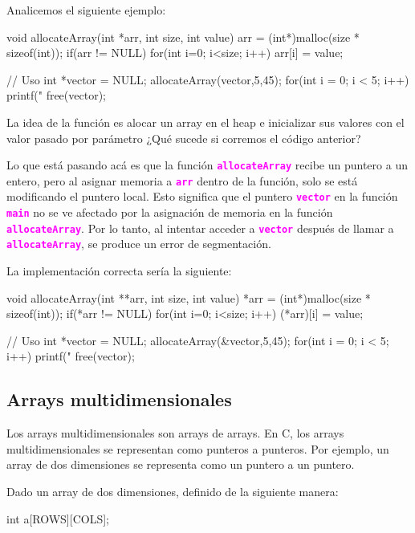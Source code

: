 \documentclass[]{scrartcl}
\newcommand{\hl}[1]{\textcolor{magenta}{\textbf{\texttt{#1}}}}
\begin{document}
Analicemos el siguiente ejemplo:

\begin{cbox}[]{}
  void allocateArray(int *arr, int size, int value) {
    arr = (int*)malloc(size * sizeof(int));
    if(arr != NULL) {
      for(int i=0; i<size; i++) {
        arr[i] = value;
      }
    }
  }
  
  // Uso
  int *vector = NULL;
  allocateArray(vector,5,45);
  for(int i = 0; i < 5; i++)
    printf("%
  free(vector);
\end{cbox}
\begin{exbox}
  La idea de la función es alocar un array en el heap e inicializar sus valores con el valor pasado por parámetro ¿Qué sucede si corremos el código anterior? 
\end{exbox}

Lo que está pasando acá es que la función \hl{allocateArray} recibe un puntero a un entero, pero al asignar memoria a \hl{arr} dentro de la función, solo se está modificando el puntero local. Esto significa que el puntero \hl{vector} en la función \hl{main} no se ve afectado por la asignación de memoria en la función \hl{allocateArray}. Por lo tanto, al intentar acceder a \hl{vector} después de llamar a \hl{allocateArray}, se produce un error de segmentación.

La implementación correcta sería la siguiente:

\begin{cbox}[]{}
  void allocateArray(int **arr, int size, int value) {
    *arr = (int*)malloc(size * sizeof(int));
    if(*arr != NULL) {
      for(int i=0; i<size; i++) {
        (*arr)[i] = value;
      }
    }
  }
  
  // Uso
  int *vector = NULL;
  allocateArray(&vector,5,45);
  for(int i = 0; i < 5; i++)
    printf("%
  free(vector);
\end{cbox}


\subsection*{Arrays multidimensionales}

Los arrays multidimensionales son arrays de arrays. En C, los arrays multidimensionales se representan como punteros a punteros. Por ejemplo, un array de dos dimensiones se representa como un puntero a un puntero. 

Dado un array de dos dimensiones, definido de la siguiente manera:

\begin{cbox}[]{}
  int a[ROWS][COLS];
\end{cbox}
\end{document}
